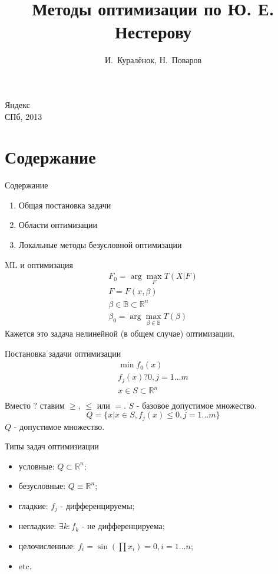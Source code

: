 \documentclass[14pt, fleqn, xcolor={dvipsnames, table}]{beamer}
\title{Методы оптимизации по Ю. Е. Нестерову\\\small{}}
\author[]{\small{%
И.~Куралёнок,
Н.~Поваров}}
\date{}
\begin{document}
\begin{frame}
\maketitle
\small
\begin{center}
\vspace{-60pt}
\normalsize {\color{red}Я}ндекс \\
\vspace{80pt}
\footnotesize СПб, 2013
\end{center}
\end{frame}

\section{Содержание}
\begin{frame}{Содержание}
\begin{enumerate}
  \item Общая постановка задачи
  \item Области оптимизации
  \item Локальные методы безусловной оптимизации
\end{enumerate}
\end{frame}

\begin{frame}{ML и оптимизация}
  $$\begin{array}{l}
  F_0 = \arg\max_F T(X|F) \\
  F = F(x, \beta) \\
  \beta \in \mathbb{B} \subset \mathbb{R}^n \\
  \beta_0 = \arg\max_{\beta \in \mathbb{B}} T(\beta)
  \end{array}$$
\small
Кажется это задача нелинейной (в общем случае) оптимизации.
\end{frame}

\begin{frame}{Постановка задачи оптимизации}
  $$\begin{array}{l}
  \min f_0(x) \\
  f_j(x)?0, j = 1...m \\
  x \in S \subset \mathbb{R}^n \\
  \end{array}$$
\small
Вместо $?$ ставим $\ge$, $\le$ или $=$. $S$ - базовое допустимое множество.
$$
Q = \{x|x \in S, f_j(x) \le 0, j = 1...m\}
$$
$Q$ - допустимое множество. 
\end{frame}

\begin{frame}{Типы задач оптимизиации}
\begin{itemize}
  \item условные: $Q \subset \mathbb{R}^n$;
  \item безусловные: $Q \equiv \mathbb{R}^n$;
  \item гладкие: $f_j$ - дифференцируемы;
  \item негладкие: $\exists k: f_k$ - не дифференцируема;
  \item целочисленные: $f_i = \sin(\prod x_i) = 0, i = 1...n$;
  \item etc.
\end{itemize}
\end{frame}
\end{document}
